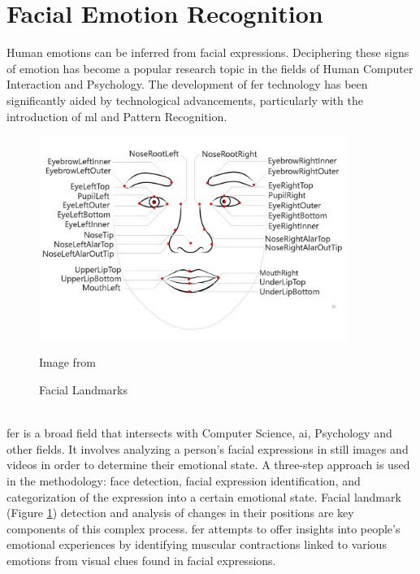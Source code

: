 \section{Facial Emotion Recognition}
Human emotions can be inferred from facial expressions. 
Deciphering these signs of emotion has become a popular research topic in the fields of Human Computer Interaction and Psychology. \cite{vemou_2021_facial}
The development of \gls{fer} technology has been significantly aided by technological advancements, particularly with the introduction of \gls{ml} and Pattern Recognition.
\\
\begin{figure}[!ht]
    \centering
    \includegraphics[width=10cm]{Images/landmarks.jpg}
    \caption{Facial Landmarks} \footnotesize{Image from \cite{patrickfarley_2023_face}}
    \label{fig:facial_landmark}
\end{figure}
\\
\indent \gls{fer} is a broad field that intersects with Computer Science, \gls{ai}, Psychology and other fields. 
It involves analyzing a person's facial expressions in still images and videos in order to determine their emotional state. 
A three-step approach is used in the methodology: face detection, facial expression identification, and categorization of the expression into a certain emotional state. 
Facial landmark (Figure \ref{fig:facial_landmark}) detection and analysis of changes in their positions are key components of this complex process. 
\gls{fer} attempts to offer insights into people's emotional experiences by identifying muscular contractions linked to various emotions from visual clues found in facial expressions.
\\
